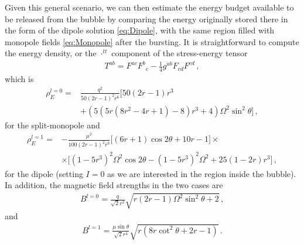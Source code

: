 \documentclass{aa}
\newcommand{\bea}{\begin{eqnarray}}
\newcommand{\eea}{\end{eqnarray}}
\begin{document}
Given this general scenario, we can then estimate the energy budget available to be released from the bubble by comparing the energy originally stored there in the form of the dipole solution \eqref{eq:Dipole}, with the same region filled with monopole fields \eqref{eq:Monopole} after the bursting. It is straightforward to compute the energy density, or the ${\cdot}^{tt}$ component of the stress-energy tensor 
\bea
T^{ab}=F^{ac}F^b{}_c - \frac{1}{4} g^{ab} F_{cd}F^{cd}\,,
\eea
which is 
\begin{align} \label{eq:EDensity0}
\rho_E^{l=0}=& \frac{q^2}{50 (2 r-1)^2 r^6} \Big[50 (2 r-1) r^3  \nonumber \\
&+\left(5 \left(5 r \left(8 r^2-4 r+1\right)-8\right) r^3+4\right) \Omega ^2 \sin ^2\theta \Big]\,,
\end{align}
for the split-monopole and 
\begin{align} \label{eq:EDensity1}
\rho_E^{l=1}=&-\frac{\mu ^2}{100 (2 r-1)^2 r^9} \Big[(6 r+1) \cos 2 \theta +10 r-1 \Big] \times \nonumber \\
&\times \Big[\left(1-5 r^3\right)^2 \Omega ^2 \cos 2 \theta-\left(1-5 r^3\right)^2 \Omega ^2+25 (1-2 r) r^3\Big]
\,,
\end{align}
for the dipole (setting $I=0$ as we are interested in the region inside the bubble).
In addition, the magnetic field strengths in the two cases are
\bea \label{eq:MonopoleBStrength}
B^{l=0}=\frac{q}{\sqrt{2} r^2} \sqrt{r (2 r-1) \Omega ^2 \sin ^2\theta +2}\,,
\eea
and 
\bea \label{eq:DipoleBStrength}
B^{l=1}=\frac{\mu\sin \theta }{\sqrt{2} r^4} \sqrt{r \left(8 r \cot ^2\theta +2 r-1\right)}\,.
\eea
\end{document}
